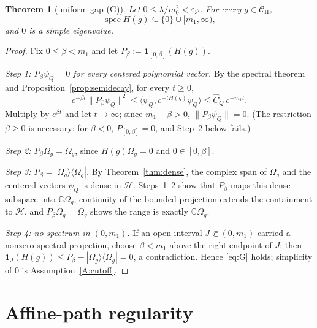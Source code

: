 \documentclass[11pt,a4paper]{article}
\theoremstyle{plain}
\newtheorem{theorem}{Theorem}[section]
\theoremstyle{definition}
\theoremstyle{plain}
\theoremstyle{definition}
\newcommand{\C}{\mathbb{C}}
\newcommand{\CH}{\mathcal{C}_{\mathrm H}}
\newcommand{\HH}{\mathcal{H}}
\newcommand{\Om}{\Omega}
\newcommand{\ip}[2]{\langle #1,#2\rangle}
\DeclareMathOperator{\spec}{spec}
\begin{document}
\begin{theorem}[uniform gap (G)]\label{thm:G}
Let $0\le\lambda/m_0^2<\varepsilon_{\mathscr P}$. For every $g\in\CH$,
\begin{equation}
 \spec H(g)\subseteq\{0\}\cup[m_1,\infty),
 \tag{G}\label{eq:G}
\end{equation}
and $0$ is a simple eigenvalue.
\end{theorem}

\begin{proof}
Fix $0\le\beta<m_1$ and let $P_\beta:=\mathbf 1_{[0,\beta]}(H(g))$.

\emph{Step 1: $P_\beta\psi_Q=0$ for every centered polynomial vector.} By the spectral
theorem and Proposition~\ref{prop:semidecay}, for every $t\ge0$,
\[
 e^{-\beta t}\|P_\beta\psi_Q\|^2
 \le\ip{\psi_Q}{e^{-tH(g)}\psi_Q}
 \le\widehat C_Q\,e^{-m_1t} .
\]
Multiply by $e^{\beta t}$ and let $t\to\infty$; since $m_1-\beta>0$,
$\|P_\beta\psi_Q\|=0$. (The restriction $\beta\ge0$ is necessary: for $\beta<0$, $P_{[0,\beta]}=0$, and
Step~2 below fails.)

\emph{Step 2: $P_\beta\Om_g=\Om_g$}, since $H(g)\Om_g=0$ and $0\in[0,\beta]$.

\emph{Step 3: $P_\beta=|\Om_g\rangle\langle\Om_g|$.} By Theorem~\ref{thm:dense}, the
complex span of $\Om_g$ and the centered vectors $\psi_Q$ is dense in $\HH$. Steps~1--2
show that $P_\beta$ maps this dense subspace into $\C\Om_g$; continuity of the bounded
projection extends the containment to $\HH$, and $P_\beta\Om_g=\Om_g$ shows the range is
exactly $\C\Om_g$.

\emph{Step 4: no spectrum in $(0,m_1)$.} If an open interval $J\Subset(0,m_1)$ carried a
nonzero spectral projection, choose $\beta<m_1$ above the right endpoint of $J$; then
$\mathbf 1_J(H(g))\le P_\beta-|\Om_g\rangle\langle\Om_g|=0$, a contradiction. Hence
\eqref{eq:G} holds; simplicity of $0$ is Assumption~\ref{A:cutoff}.
\end{proof}

\section{Affine-path regularity}\label{sec:path}
\end{document}
